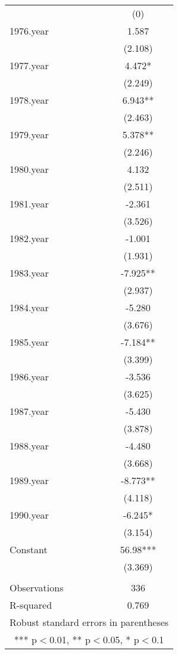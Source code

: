 \begin{tabular}{lc}
 & (0) \\
1976.year & 1.587 \\
 & (2.108) \\
1977.year & 4.472* \\
 & (2.249) \\
1978.year & 6.943** \\
 & (2.463) \\
1979.year & 5.378** \\
 & (2.246) \\
1980.year & 4.132 \\
 & (2.511) \\
1981.year & -2.361 \\
 & (3.526) \\
1982.year & -1.001 \\
 & (1.931) \\
1983.year & -7.925** \\
 & (2.937) \\
1984.year & -5.280 \\
 & (3.676) \\
1985.year & -7.184** \\
 & (3.399) \\
1986.year & -3.536 \\
 & (3.625) \\
1987.year & -5.430 \\
 & (3.878) \\
1988.year & -4.480 \\
 & (3.668) \\
1989.year & -8.773** \\
 & (4.118) \\
1990.year & -6.245* \\
 & (3.154) \\
Constant & 56.98*** \\
 & (3.369) \\
 &  \\
Observations & 336 \\
 R-squared & 0.769 \\ \hline
\multicolumn{2}{c}{ Robust standard errors in parentheses} \\
\multicolumn{2}{c}{ *** p$<$0.01, ** p$<$0.05, * p$<$0.1} \\
\end{tabular}
